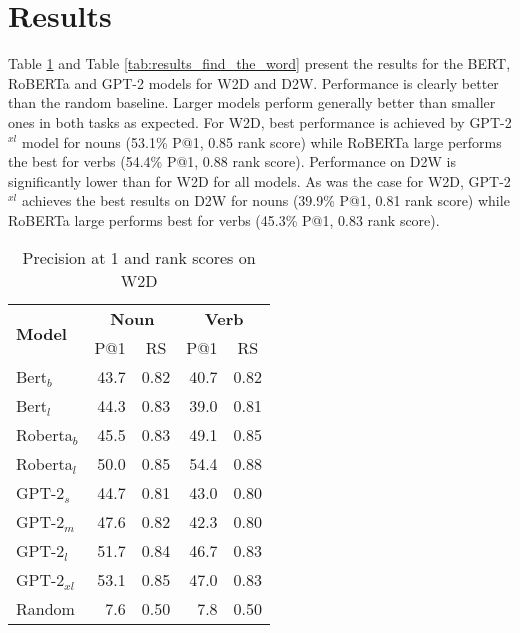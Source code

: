 \documentclass[11pt,a4paper]{article}
\begin{document}
\section{Results}

Table \ref{tab:results_find_the_definition} and Table
\ref{tab:results_find_the_word} present the results for the
BERT, RoBERTa and GPT-2 models
for W2D and D2W. Performance is clearly better than the
random baseline.
Larger models perform generally better than smaller
ones in both tasks as expected. For W2D,
best performance is achieved by GPT-2$^{xl}$ model for 
nouns (53.1\% P@1, 0.85 rank score) while RoBERTa large
performs the best for  verbs (54.4\% P@1, 0.88 rank
score). Performance on D2W is
significantly lower than for W2D for all
models.  As was the case for W2D, GPT-2$^{xl}$ achieves the
best results on D2W for  nouns (39.9\% P@1, 0.81 rank
score) while RoBERTa large performs best for  verbs
(45.3\% P@1, 0.83 rank score).

\begin{table}
    \centering
    \begin{tabular}{l|rrrr}
        \hline
         \multirow{2}{*}{\textbf{Model}} & \multicolumn{2}{c}{\textbf{Noun}} & \multicolumn{2}{c}{\textbf{Verb}} \\
         & \multicolumn{1}{c}{P@1} & \multicolumn{1}{c}{RS} & \multicolumn{1}{c}{P@1} & \multicolumn{1}{c}{RS} \\ \hline
     Bert$_{b}$ & 43.7 & 0.82 & 40.7 & 0.82 \\
     Bert$_{l}$ & 44.3 & 0.83 & 39.0 & 0.81 \\
     Roberta$_{b}$ & 45.5 & 0.83 & 49.1 & 0.85 \\
     Roberta$_{l}$ & 50.0 & 0.85 & 54.4 & 0.88 \\ \hline
     GPT-2$_{s}$ & 44.7 & 0.81 & 43.0 & 0.80 \\
     GPT-2$_{m}$ & 47.6 & 0.82 & 42.3 & 0.80 \\
     GPT-2$_{l}$ & 51.7 & 0.84 & 46.7 & 0.83 \\
     GPT-2$_{xl}$ & 53.1 & 0.85 & 47.0 & 0.83 \\ \hline 
     Random & 7.6 & 0.50 & 7.8 & 0.50 \\\hline
     
    \end{tabular}
    \caption{Precision at 1 and rank scores on W2D}
    \label{tab:results_find_the_definition}
\end{table}
\end{document}

